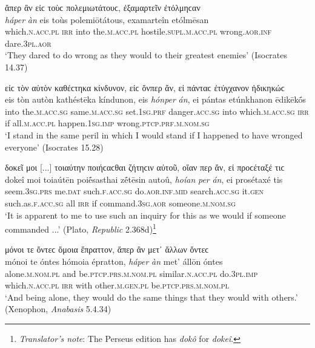 \begin{exe}
\ex ἅπερ ἂν εἰϲ τοὺϲ πολεμιωτάτουϲ, ἐξαμαρτεῖν ἐτόλμηϲαν\\
\gll \emph{háper} \emph{àn} eis toùs polemiōtátous, examarteîn etólmēsan\\
which.\textsc{n.acc.pl} \textsc{irr} into the.\textsc{m.acc.pl} hostile.\textsc{supl.m.acc.pl} wrong.\textsc{aor.inf} dare.\textsc{3pl.aor}\\
\trans `They dared to do wrong as they would to their greatest enemies' (Isocrates 14.37)
\label{relan66}
\end{exe}

\begin{exe}
\ex εἰϲ τὸν αὐτὸν καθέϲτηκα κίνδυνον, εἰϲ ὅνπερ ἄν, εἰ πάνταϲ ἐτύγχανον ἠδικηκώϲ\\
\gll eis tòn autòn kathéstēka kíndunon, eis \emph{hónper} \emph{án}, ei pántas etúnkhanon ēdikēkṓs\\
into the.\textsc{m.acc.sg} same.\textsc{m.acc.sg} set.\textsc{1sg.prf} danger.\textsc{acc.sg} into which.\textsc{m.acc.sg} \textsc{irr} if all.\textsc{m.acc.pl} happen.\textsc{1sg.imp} wrong.\textsc{ptcp.prf.m.nom.sg}\\
\trans `I stand in the same peril in which I would stand if I happened to have wronged everyone' (Isocrates 15.28)
\label{relan67}
\end{exe}

\begin{exe}
\ex δοκεῖ μοι {[}...{]} τοιαύτην ποιήϲαϲθαι ζήτηϲιν αὐτοῦ, οἵαν περ ἄν, εἰ προϲέταξέ τιϲ\\
\gll dokeî moi toiaútēn poiḗsasthai zḗtēsin autoû, \emph{hoían} \emph{per} \emph{án}, ei prosétaxé tis\\
seem.\textsc{3sg.prs} me.\textsc{dat} such.\textsc{f.acc.sg} do.\textsc{aor.inf.mid} search.\textsc{acc.sg} it.\textsc{gen} such.as.\textsc{f.acc.sg} all \textsc{irr} if command.\textsc{3sg.aor} someone.\textsc{m.nom.sg}\\
\trans `It is apparent to me to use such an inquiry for this as we would if someone commanded ...' (Plato, \textit{Republic} 2.368d)\footnote{\emph{Translator's note}: The Perseus edition has \textit{dokô} for \textit{dokeî}.}
\label{relan68}
\end{exe}

\begin{exe}
\ex μόνοι τε ὄντεϲ ὅμοια ἔπραττον, ἅπερ ἂν μετ᾽ ἄλλων ὄντεϲ\\
\gll mónoi te óntes hómoia épratton, \emph{háper} \emph{àn} met' állōn óntes\\
alone.\textsc{m.nom.pl} and be.\textsc{ptcp.prs.m.nom.pl} similar.\textsc{n.acc.pl} do.\textsc{3pl.imp} which.\textsc{n.acc.pl} \textsc{irr} with other.\textsc{m.gen.pl} be.\textsc{ptcp.prs.m.nom.pl}\\
\trans `And being alone, they would do the same things that they would with others.' (Xenophon, \textit{Anabasis} 5.4.34)
\label{relan69}
\end{exe}


